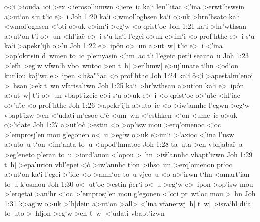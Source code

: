 o<i
>iouda~ioi
>ex
<ierosol'umwn
<iere~ic
ka`i
leu"'itac
<'ina
>erwt'hswsin
a>ut`on
s`u
t'ic
e>~i\bibvsend
\vs Joh 1:20
ka`i
<wmol'oghsen
ka`i
o>uk
>hrn'hsato
ka`i
<wmol'oghsen
<'oti
o>uk\r{}
e>im`i
>eg`w
<o
qrist'oc\bibvsend
\vs Joh 1:21
ka`i
>hr'wthsan
a>ut`on
t'i
o>~un
<hl'iac\r{}
e>~i
s`u
ka`i
l'egei
o>uk
e>im`i
<o
prof'hthc
e>~i
s`u
ka`i
>apekr'ijh
o>'u\bibvsend
\vs Joh 1:22
e>~ip\r{o}n
o>~un
a>ut~w|
t'ic
e>~i
<'ina
>ap'okrisin
d~wmen
to~ic
p'emyasin
<hm~ac
t'i
l'egeic
per`i
seauto~u\bibvsend
\vs Joh 1:23
>'efh
>eg`w
vfwn`h
vbo~wntoc
>en
t~h|
>er'hmw|
e>uj'unate
t`hn
<od`on
kur'iou
kaj`wc
e>~ipen
<h\r{s}a"'iac
<o
prof'hthc\bibvsend
\vs Joh 1:24
ka`i
\r{o}<i
>apestalm'enoi
>~hsan
>ek
t~wn
vfarisa'iwn\bibvsend
\vs Joh 1:25
ka`i
>hr'wthsan
a>ut`on
ka`i
e>~ip\r{o}n
a>ut~w|
t'i
o>~un
vbapt'izeic
e>i
s`u
o>uk
e>~i
<o
qrist`oc
o>'u\r{t}e
<hl'iac
o>'u\r{t}e
<o
prof'hthc\bibvsend
\vs Joh 1:26
>apekr'ijh
a>uto~ic
<o
>iw'annhc
l'egwn
>eg`w
vbapt'izw
>en
<'udati
m'esoc
d`e\r{}
<um~wn
<'esthken
<`on
<ume~ic
o>uk
o>'idate\bibvsend
\vs Joh 1:27
a>ut'oc\r{}
>estin
<o
>op'isw
mou
>erq'omenoc
<`oc
>'emprosj'en
mou
g'egonen
o<~u
>eg`w
o>uk
e>im`i
>'axioc
<'ina
l'usw
a>uto~u
t`on
<im'anta
to~u
<upod'hmatoc\bibvsend
\vs Joh 1:28
ta~uta
>en
vbhjaba\r{r}~a
>eg'eneto
p'eran
to~u
>iord'anou
<'opou
>~hn
>i\r{w}'annhc
vbapt'izwn\bibvsend
\vs Joh 1:29
t~h|
>epa'urion
vbl'epei
<o\r{}
>iw'annhc
t`on
>ihso~un
>erq'omenon
pr`oc
a>ut`on
ka`i
l'egei
>'ide
<o
>amn`oc
to~u
vjeo~u
<o
a>'irwn
t`hn
<amart'ian
to~u
k'osmou\bibvsend
\vs Joh 1:30
o<~ut'oc
>estin
\r{p}er`i
o<~u
>eg`w
e>~ipon
>op'isw
mou
>'erqetai
>an`hr
<`oc
>'emprosj'en
mou
g'egonen
<'oti
pr~wt'oc
mou
>~hn\bibvsend
\vs Joh 1:31
k>ag`w
o>uk
>'h|dein
a>ut`on
>all>
<'ina
vfanerwj~h|
t~w|
>isra`hl
di`a
to~uto
>~hljon
>eg`w
>en
\r{t}~w|
<'udati
vbapt'izwn\bibvsend
